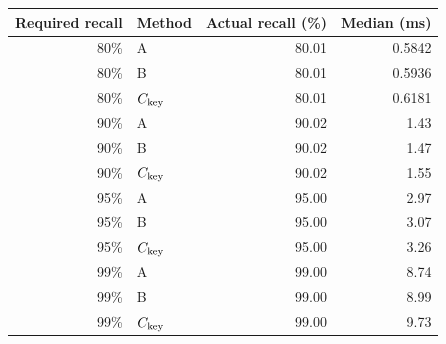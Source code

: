 \begin{tabular}{rlrr}
\toprule
Required recall & Method & Actual recall (\%) & Median (ms) \\
\midrule
80\% & A & 80.01 & 0.5842 \\
80\% & B & 80.01 & 0.5936 \\
80\% & $C_{\rm key}$ & 80.01 & 0.6181 \\
90\% & A & 90.02 & 1.43 \\
90\% & B & 90.02 & 1.47 \\
90\% & $C_{\rm key}$ & 90.02 & 1.55 \\
95\% & A & 95.00 & 2.97 \\
95\% & B & 95.00 & 3.07 \\
95\% & $C_{\rm key}$ & 95.00 & 3.26 \\
99\% & A & 99.00 & 8.74 \\
99\% & B & 99.00 & 8.99 \\
99\% & $C_{\rm key}$ & 99.00 & 9.73 \\
\bottomrule
\end{tabular}
